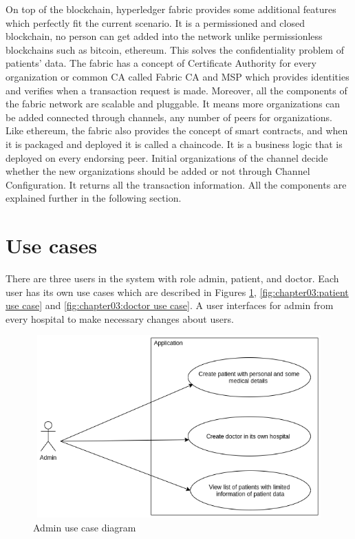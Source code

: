 On top of the blockchain, hyperledger fabric provides some additional features which perfectly fit the current scenario. It is a permissioned and closed blockchain, no person can get added into the network unlike permissionless blockchains such as bitcoin, ethereum. This solves the confidentiality problem of patients' data. The fabric has a concept of Certificate Authority for every organization or common CA called Fabric CA and MSP which provides identities and verifies when a transaction request is made. Moreover, all the components of the fabric network are scalable and pluggable. It means more organizations can be added connected through channels, any number of peers for organizations. Like ethereum, the fabric also provides the concept of smart contracts, and when it is packaged and deployed it is called a chaincode. It is a business logic that is deployed on every endorsing peer. Initial organizations of the channel decide whether the new organizations should be added or not through Channel Configuration. It returns all the transaction information. All the components are explained further in the following section.

%
%
\section{Use cases}
\label{sec:intro:Use cases}
There are three users in the system with role admin, patient, and doctor. Each user has its own use cases which are described in Figures \ref{fig:chapter03:admin use case}, \ref{fig:chapter03:patient use case} and \ref{fig:chapter03:doctor use case}. A user interfaces for admin from every hospital to make necessary changes about users.

\begin{figure}[htbp]
 \centering
 \includegraphics[width=1\textwidth, height=7cm]{gfx/figures/Admin use case .png}
 \caption{Admin use case diagram}
 \label{fig:chapter03:admin use case}
\end{figure}


